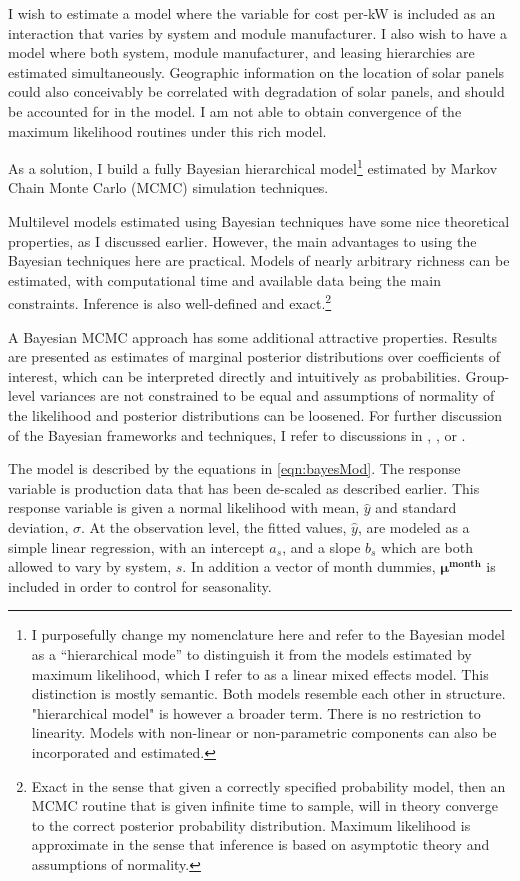 \documentclass[a4paper]{article}
\begin{document}
I wish to estimate a model where the variable for cost per-kW is included as an interaction that varies by system and module manufacturer. I also wish to have a model where both system, module manufacturer, and leasing hierarchies are estimated simultaneously. Geographic information on the location of solar panels could also conceivably be correlated with degradation of solar panels, and should be accounted for in the model.  I am not able to obtain convergence of the maximum likelihood routines under this rich model.

As a solution, I build a fully Bayesian hierarchical model\footnote{I purposefully change my nomenclature here and refer to the Bayesian model as a ``hierarchical mode'' to distinguish it from the models estimated by maximum likelihood, which I refer to as a linear mixed effects model. This distinction is mostly semantic. Both models resemble each other in structure. "hierarchical model" is however a broader term. There is no restriction to linearity. Models with non-linear or non-parametric components can also be incorporated and estimated.} estimated by Markov Chain Monte Carlo (MCMC) simulation techniques.

Multilevel models estimated using Bayesian techniques have some nice theoretical properties, as I discussed earlier. However, the main advantages to using the Bayesian techniques here are practical. Models of nearly arbitrary richness can be estimated, with computational time and available data being the main constraints. Inference is also well-defined and exact.\footnote{Exact in the sense that given a correctly specified probability model, then an MCMC routine that is given infinite time to sample, will in theory converge to the correct posterior probability distribution. Maximum likelihood is approximate in the sense that inference is based on asymptotic theory and assumptions of normality.}

A Bayesian MCMC approach has some additional attractive properties. Results are presented as estimates of marginal posterior distributions over coefficients of interest, which can be interpreted directly and intuitively as probabilities. Group-level variances are not constrained to be equal and assumptions of normality of the likelihood and posterior distributions can be loosened. For further discussion of the Bayesian frameworks and techniques, I refer to discussions in \citet{gelman_bayesian_2013}, \citet{kruschke_doing_2014}, or \citet{mcelreath_statistical_2015}.

The model is described by the equations in \ref{eqn:bayesMod}. The response variable is production data that has been de-scaled as described earlier. This response variable is given a normal likelihood with mean, $\hat{y}$ and standard deviation, $\sigma$. At the observation level, the fitted values, $\hat{y}$, are modeled as a simple linear regression, with an intercept $a_s$, and a slope $b_s$ which are both allowed to vary by system, $s$. In addition a vector of month dummies, $\mathbf{\mu^{month}}$ is included in order to control for seasonality.
\end{document}
